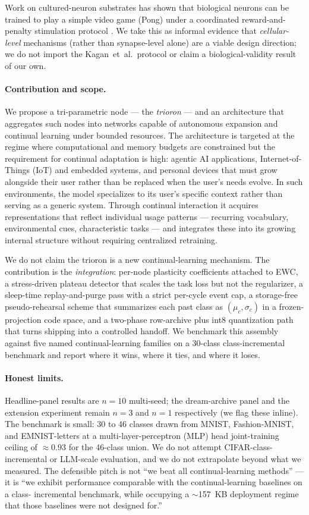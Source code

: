 \documentclass[11pt]{article}
\begin{document}
Work on cultured-neuron substrates has shown that biological neurons can
be trained to play a simple video game (Pong) under a coordinated
reward-and-penalty stimulation protocol \citep{kagan2022dishbrain}. We
take this as informal evidence that \emph{cellular-level} mechanisms
(rather than synapse-level alone) are a viable design direction; we do
not import the Kagan~et~al.\ protocol or claim a biological-validity
result of our own.

\paragraph{Contribution and scope.}
We propose a tri-parametric node --- the \emph{trioron} --- and an
architecture that aggregates such nodes into networks capable of
autonomous expansion and continual learning under bounded resources. The
architecture is targeted at the regime where computational and memory
budgets are constrained but the requirement for continual adaptation is
high: agentic AI applications, Internet-of-Things (IoT) and embedded systems, and personal
devices that must grow alongside their user rather than be replaced when
the user's needs evolve. In such environments, the model specializes to
its user's specific context rather than serving as a generic system.
Through continual interaction it acquires representations that reflect
individual usage patterns --- recurring vocabulary, environmental cues,
characteristic tasks --- and integrates these into its growing internal
structure without requiring centralized retraining.

We do not claim the trioron is a new continual-learning mechanism. The
contribution is the \emph{integration}: per-node plasticity coefficients
attached to EWC, a stress-driven plateau detector that scales the task
loss but not the regularizer, a sleep-time replay-and-purge pass with a
strict per-cycle event cap, a storage-free pseudo-rehearsal scheme that
summarizes each past class as $(\mu_c, \sigma_c)$ in a frozen-projection
code space, and a two-phase row-archive plus int8 quantization path that
turns shipping into a controlled handoff. We benchmark this assembly
against five named continual-learning families on a 30-class
class-incremental benchmark and report where it wins, where it ties, and
where it loses.

\paragraph{Honest limits.}
Headline-panel results are $n = 10$ multi-seed; the dream-archive
panel and the extension experiment remain $n = 3$ and $n = 1$
respectively (we flag these inline). The benchmark is small: 30 to
46 classes drawn from MNIST, Fashion-MNIST, and EMNIST-letters at a
multi-layer-perceptron (MLP) head joint-training ceiling of
$\approx 0.93$ for the 46-class union. We do not attempt CIFAR-class-incremental or LLM-scale evaluation,
and we do not extrapolate beyond what we measured. The defensible pitch
is not ``we beat all continual-learning methods'' --- it is ``we exhibit
performance comparable with the continual-learning baselines on a class-
incremental benchmark, while occupying a $\sim$157~KB deployment regime
that those baselines were not designed for.''
\end{document}

